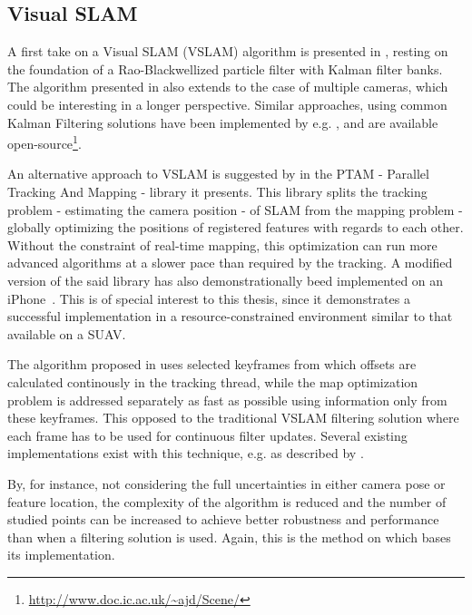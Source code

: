     \subsection{Visual SLAM}
    A first take on a Visual SLAM (VSLAM) algorithm is presented in \citep{Karlsson05thevslam}, resting on the
    foundation of a Rao-Blackwellized particle filter with Kalman filter banks.
    The algorithm presented in \citep{Karlsson05thevslam} also extends to
    the case of multiple cameras, which could be interesting in a longer perspective.
    Similar approaches, using common Kalman Filtering solutions have been implemented by e.g. \citep{DBLP:conf/iccv/Davison03,Eade:2006:SMS:1153170.1153506},
    and are available open-source\footnote{\url{http://www.doc.ic.ac.uk/~ajd/Scene/}}.

    An alternative approach to VSLAM is suggested by \citep{klein07parallel} in the PTAM - Parallel Tracking And Mapping - library it presents.
    This library splits the tracking problem - estimating the camera position -
    of SLAM from the mapping problem - globally optimizing the positions of
    registered features with regards to each other.
    Without the constraint of real-time mapping, this optimization can run
    more advanced algorithms at a slower pace than required by the tracking.
    A modified version of the said library has also demonstrationally beed implemented on an iPhone~\citep{klein09cameraphone}.
    This is of special interest to this thesis, since it demonstrates
    a successful implementation in a resource-constrained environment similar to that available on a SUAV.

    The algorithm proposed in \citep{klein07parallel} uses selected keyframes
    from which offsets are calculated continously in the tracking thread, while
    the map optimization problem is addressed separately as fast as possible using information only
    from these keyframes. This opposed to the traditional VSLAM filtering
    solution where each frame has to be used for continuous filter updates.
    Several existing implementations exist with this technique, e.g. as described by \citep{DBLP:conf/iccv/Davison03}.

    By, for instance, not considering the full uncertainties in either camera pose or feature location,
    the complexity of the algorithm is reduced and the number of studied points
    can be increased to achieve better robustness and
    performance than when a filtering solution is used\citep{DBLP:conf/icra/StrasdatMD10}.
    Again, this is the method on which \citep{weiss11monocular} bases its implementation.
